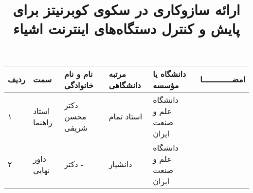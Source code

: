 \subject{مهندسی کامپیوتر}
\title{ارائه سازوکاری در سکوی کوبرنیتز برای پایش و کنترل دستگاه‌های اینترنت اشیاء}


\firstPage
\davaranPage

\begin{center}
    \begin{tabular}{| p{8mm} | p{18mm} | p{} |p{14mm}|p{}|c|}
        \hline
        ردیف & سمت          & نام و نام خانوادگی           & مرتبه \newline دانشگاهی & دانشگاه یا مؤسسه                  & امضـــــــــــــا \\
        \hline
        ۱    & استاد راهنما & دکتر \newline محسن شریفی & استاد تمام                 & دانشگاه \newline علم و صنعت ایران &                   \\
        \hline
        ۲    & داور نهایی   & دکتر \newline  -        & دانشیار                 & دانشگاه \newline علم و صنعت ایران &                   \\
        \hline
    \end{tabular}
\end{center}

